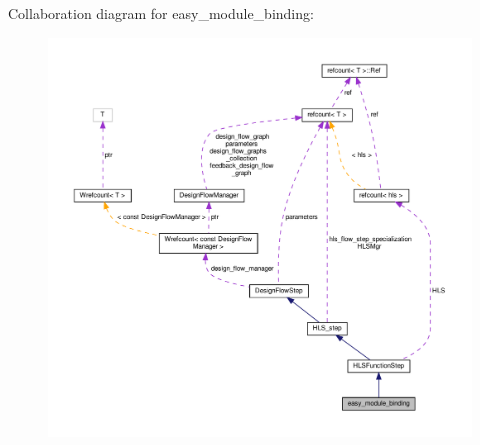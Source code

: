 Collaboration diagram for easy\+\_\+module\+\_\+binding\+:
\nopagebreak
\begin{figure}[H]
\begin{center}
\leavevmode
\includegraphics[width=350pt]{db/ded/classeasy__module__binding__coll__graph}
\end{center}
\end{figure}
